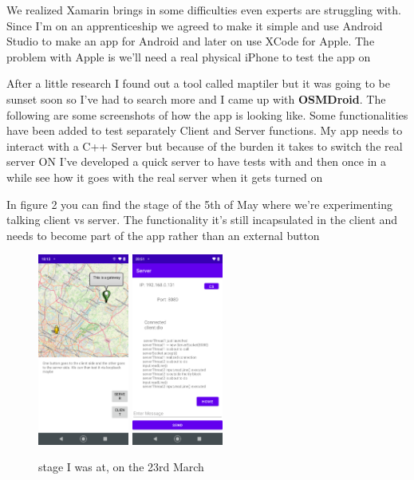 \documentclass[a4paper,12pt]{article}
\begin{document}
We realized Xamarin brings in some difficulties even experts are struggling with. Since I'm on an apprenticeship we agreed to make it simple and use Android Studio to make an app for Android and later on use XCode for Apple. The problem with Apple is we'll need a real physical iPhone to test the app on

After a little research I found out a tool called maptiler but it was going to be sunset soon so I've had to search more and I came up with \textbf{OSMDroid}. The following are some screenshots of how the app is looking like. Some functionalities have been added to test separately Client and Server functions. My app needs to interact with a C++ Server but because of the burden it takes to switch the real server ON I've developed a quick server to have tests with and then once in a while see how it goes with the real server when it gets turned on

\clearpage

In figure 2 you can find the stage of the 5th of May where we're experimenting talking client vs server. The functionality it's still incapsulated in the client and needs to become part of the app rather than an external button
\begin{figure}
\includegraphics[width=3cm]{./current_status_g7.PNG}
\includegraphics[width=3cm]{./server_g7.PNG}
\caption{stage I was at, on the 23rd March}\label{wrap-fig:2}
\end{figure}
\end{document}
